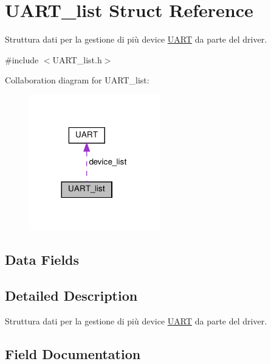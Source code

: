 \hypertarget{structUART__list}{}\section{U\+A\+R\+T\+\_\+list Struct Reference}
\label{structUART__list}


Struttura dati per la gestione di più device \hyperlink{structUART}{U\+A\+RT} da parte del driver.  




{\ttfamily \#include $<$U\+A\+R\+T\+\_\+list.\+h$>$}



Collaboration diagram for U\+A\+R\+T\+\_\+list\+:\nopagebreak
\begin{figure}[H]
\begin{center}
\leavevmode
\includegraphics[width=161pt]{structUART__list__coll__graph}
\end{center}
\end{figure}
\subsection*{Data Fields}


\subsection{Detailed Description}
Struttura dati per la gestione di più device \hyperlink{structUART}{U\+A\+RT} da parte del driver. 

\subsection{Field Documentation}
\mbox{\label{structUART__list_a170d1d78f27f6ab4c8badaaa4b3f2305}} 
